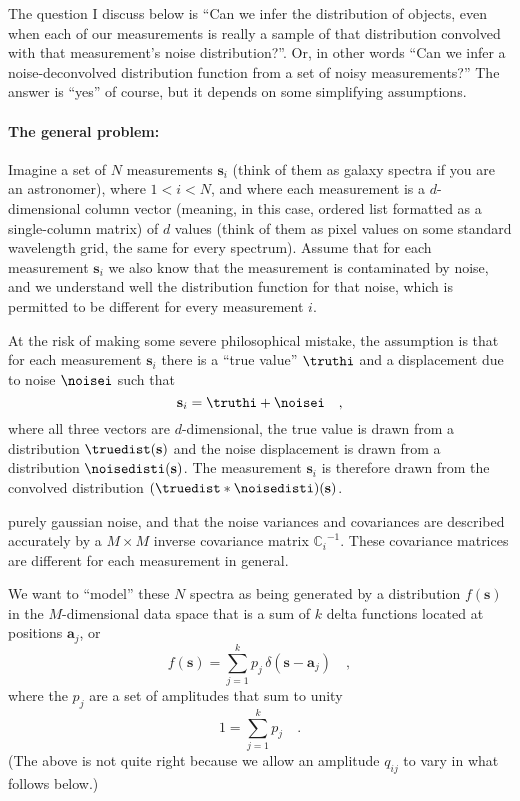 \documentclass[12pt]{article}
\newcommand{\ampj}{p_j}
\newcommand{\ampij}{q_{ij}}
\newcommand{\Mvector}[1]{\mathbf{#1}}
\newcommand{\point}{\Mvector{s}}
\newcommand{\spectrumi}{\point_i}
\newcommand{\archetypej}{\Mvector{a}_j}
\newcommand{\Mmatrix}[1]{\mathbb{#1}}
\newcommand{\covari}{\Mmatrix{C}_i}
\newcommand{\inverse}[1]{{#1}^{-1}}
\newcommand{\invcovari}{\inverse{\covari}}
\begin{document}
The question I discuss below is ``Can we infer the distribution of
objects, even when each of our measurements is really a sample of that
distribution convolved with that measurement's noise distribution?''.
Or, in other words ``Can we infer a noise-deconvolved distribution
function from a set of noisy measurements?''  The answer is ``yes'' of
course, but it depends on some simplifying assumptions.

\paragraph{The general problem:}
Imagine a set of $N$ measurements $\spectrumi$ (think of them as
galaxy spectra if you are an astronomer), where $1<i<N$, and where
each measurement is a $d$-dimensional column vector (meaning, in this
case, ordered list formatted as a single-column matrix) of $d$ values
(think of them as pixel values on some standard wavelength grid, the
same for every spectrum).  Assume that for each measurement
$\spectrumi$ we also know that the measurement is contaminated by
noise, and we understand well the distribution function for that
noise, which is permitted to be different for every measurement $i$.

At the risk of making some severe philosophical mistake, the
assumption is that for each measurement $\spectrumi$ there is a ``true
value'' $\truthi$ and a displacement due to noise $\noisei$ such that
\begin{equation}
\spectrumi=\truthi+\noisei
\quad ,
\end{equation}
where all three vectors are $d$-dimensional, the true value is drawn
from a distribution $\truedist(\point)$ and the noise displacement is
drawn from a distribution $\noisedisti(\point)$.  The measurement
$\spectrumi$ is therefore drawn from the convolved distribution
$(\truedist * \noisedisti)(\point)$.


purely gaussian noise, and that the noise variances and covariances
are described accurately by a $M\times M$ inverse covariance matrix
$\invcovari$.  These covariance matrices are different for each
measurement in general.


We want to ``model'' these $N$ spectra as being generated by a
distribution $f(\point)$ in the $M$-dimensional data space that is a
sum of $k$ delta functions located at positions $\archetypej$, or
\begin{equation}
f(\point) = \sum_{j=1}^{k} \ampj\,\delta(\point-\archetypej) \quad ,
\end{equation}
where the $\ampj$ are a set of amplitudes that sum to unity
\begin{equation}
1 = \sum_{j=1}^{k} \ampj \quad .
\end{equation}
(The above is not quite right because we allow an amplitude $\ampij$
to vary in what follows below.)
\end{document}
